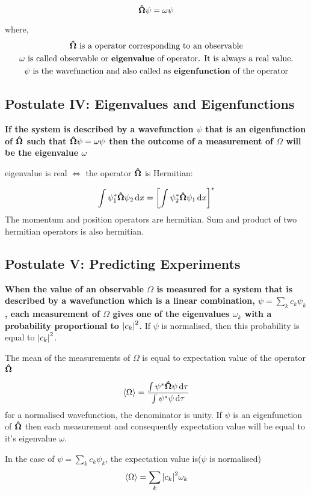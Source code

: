 \documentclass[11pt]{article}
\theoremstyle{definition}
\begin{document}
\begin{equation*}
    \vectorunit{\Omega} \psi = \omega \psi
\end{equation*}

where,
\begin{gather*}
    \vectorunit{\Omega} \text{ is a operator corresponding to an observable} \\
    \omega\text{ is called observable or \textbf{eigenvalue} of operator. It is always a real value.}\\
    \psi \text{ is the wavefunction and also called as \textbf{eigenfunction} of the operator}
\end{gather*}
\subsection{Postulate IV: Eigenvalues and Eigenfunctions}
\textbf{If the system is described by a wavefunction $\psi$ that is an eigenfunction of $\vectorunit{\Omega}$ such that $\vectorunit{\Omega} \psi = \omega \psi$ then the outcome of a measurement of $\Omega$ will be the eigenvalue $\omega$}

eigenvalue is real $\iff$ the operator $\vectorunit{\Omega}$ is Hermitian:

\begin{equation*}
    \int \psi_1 ^* \vectorunit{\Omega} \psi_2 \dd{x} = \left[ \int \psi_2 ^* \vectorunit{\Omega} \psi_1 \dd{x} \right]^*
\end{equation*}
The momentum and position operators are hermitian. Sum and product of two hermitian operators is also hermitian.

\subsection{Postulate V: Predicting Experiments}
\textbf{When the value of an observable $\Omega$ is measured for a system that is described by a wavefunction which is a linear combination, $\psi = \sum_k c_k \psi_k$, each measurement of $\Omega$ gives one of the eigenvalues $\omega_k$ with a probability proportional to $\abs{c_k}^2$.}
If $\psi$ is normalised, then this probability is equal to $\abs{c_k}^2$.


\begin{shaded}
The mean of the measurements of $\Omega$ is equal to expectation value of the operator $\vectorunit{\Omega}$

\begin{equation*}
    \expval{\Omega} = \frac{\int \psi^* \vectorunit{\Omega} \psi \dd{\tau}}{\int \psi^* \psi \dd{\tau}}
\end{equation*}
for a normalised wavefunction, the denominator is unity. If $\psi$ is an eigenfunction of $\vectorunit{\Omega}$ then each measurement and consequently expectation value will be equal to it's eigenvalue $\omega$.

In the case of $\psi = \sum_{k} c_k \psi_k$, the expectation value is($\psi$ is normalised)
\begin{equation*}
    \expval{\Omega} = \sum_{k} \abs{c_k}^2 \omega_k
\end{equation*}

\end{shaded}
\end{document}
